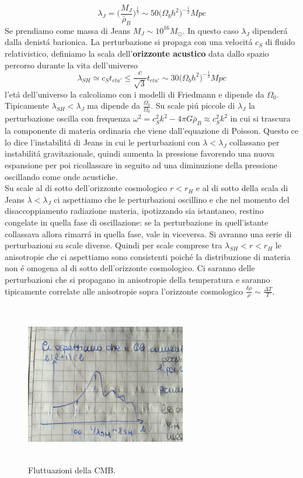 \documentclass[12pt, a4paper]{article}
\begin{document}
\begin{equation}
\lambda_J=\biggl(\frac{M_J}{\bar{\rho}_B}\biggr)^{\frac{1}{3}}\sim 50 \biggl(\Omega_b h^2\biggr)^{-\frac{1}{2}} Mpc
 \end{equation}
Se prendiamo come massa di Jeans $M_J\sim 10^{16} M_\odot$. In questo caso $\lambda_J$ dipender\'{a} dalla denist\'{a} barionica. La perturbazione si propaga con una velocit\'{a} $c_S$ di fluido relativistico, definiamo la scala dell'\textbf{orizzonte acustico} data dallo spazio percorso durante la vita dell'universo
\begin{equation}
\lambda_{SH}\simeq c_S t_{eta'} \leq \frac{c}{\sqrt{3}}t_{eta'}\sim 30 \biggl(\Omega_b h^2\biggr)^{-\frac{1}{2}} Mpc
\end{equation}
l'et\'{a} dell'universo la calcoliamo con i modelli di Friedmann e dipende da $\Omega_0$. Tipicamente $\lambda_{SH}<\lambda_J$ ma dipende da $\frac{\Omega_b}{\Omega_0}$. Su scale pi\'{u} piccole di $\lambda_J$ la perturbazione oscilla con frequenza $\omega^2= c_S^2k^2-4\pi G\bar{\rho}_B\approx c_S^2k^2$ in cui si trascura la componente di materia ordinaria che viene dall'equazione di Poisson. Questo ce lo dice l'instabilit\'{a} di Jeans in cui le perturbazioni con $\lambda<\lambda_J$ collassano per instabilit\'{a} gravitazionale, quindi aumenta la pressione favorendo una nuova espansione per poi ricollassare in seguito ad una diminuzione della pressione oscillando come onde acustiche.\\
Su scale al di sotto dell'orizzonte cosmologico  $r<r_H$ e al di sotto della scala di Jeans $\lambda<\lambda_J$ ci aspettiamo che le perturbazioni oscillino e che nel momento del disaccoppiamento radiazione materia, ipotizzando sia istantaneo, restino congelate in quella fase di oscillazione: se la perturbazione in quell'istante collassava allora rimarr\'{a} in quella fase, vale in viceversa. Si avranno una serie di perturbazioni su scale diverse.  Quindi per scale comprese tra $\lambda_{SH}<r<r_H$ le anisotropie che ci aspettiamo sono consistenti poich\'{e} la distribuzione di materia non \'{e} omogena al di sotto dell'orizzonte cosmologico. Ci saranno delle perturbazioni che si propagano in anisotropie della temperatura e saranno tipicamente correlate alle anisotropie sopra l'orizzonte cosmologico $\frac{\delta \rho}{\rho}\sim \frac{\Delta T}{T}$.
\begin{figure}[htp]
\centering
\includegraphics[width=7cm, height=7cm]{images/cmbfluc.jpeg}
\caption{Fluttuazioni della CMB.}
\label{fig:cmbfluc}
\end{figure}
\end{document}
